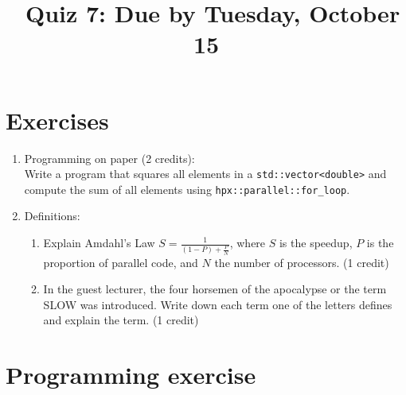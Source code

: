\documentclass[11pt]{article}
\begin{document}
\title{\coursename~Quiz 7: Due by Tuesday, October 15}
\date{}
\maketitle

\medskip


\section*{Exercises}

\begin{enumerate}
\item Programming on paper (2 credits): \\
Write a program that squares all elements in a \lstinline|std::vector<double>| and compute the sum of all elements using \lstinline|hpx::parallel::for_loop|. 


\item Definitions: \\
\begin{enumerate}
\item Explain Amdahl's Law $S=\frac{1}{(1-P)+\frac{P}{N}}$, where $S$ is the speedup, $P$ is the proportion of parallel code, and $N$ the number of processors. (1 credit)
\item In the guest lecturer, the four horsemen of the apocalypse or the term SLOW was introduced. Write down each term one of the letters defines and explain the term. (1 credit)
\end{enumerate}



\end{enumerate}

\section*{Programming exercise}
\end{document}
